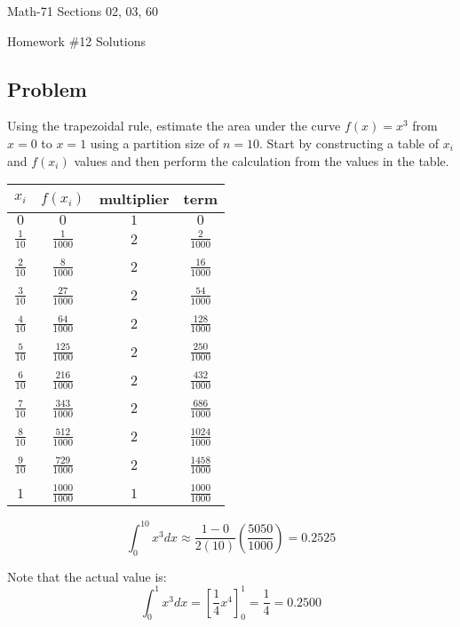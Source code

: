 \documentclass[letterpaper,12pt,fleqn]{article}
\begin{document}
\begin{center}
  \large
  Math-71 Sections 02, 03, 60

  \Large
  Homework \#12 Solutions
\end{center}

\subsection*{Problem}

Using the trapezoidal rule, estimate the area under the curve \(f(x)=x^3\) from \(x=0\) to \(x=1\) using a partition
size of \(n=10\).  Start by constructing a table of \(x_i\) and \(f(x_i)\) values and then perform the calculation
from the values in the table.

\begin{tabular}{c|c|c|c}
  \(x_i\) & \(f(x_i)\) & multiplier & term \\
  \hline
  \(0\) & \(0\) & \(1\) & \(0\) \\
  \(\frac{1}{10}\) & \(\frac{1}{1000}\) & \(2\) & \(\frac{2}{1000}\) \\
  & & & \\
  \(\frac{2}{10}\) & \(\frac{8}{1000}\) & \(2\) & \(\frac{16}{1000}\) \\
  & & & \\
  \(\frac{3}{10}\) & \(\frac{27}{1000}\) & \(2\) & \(\frac{54}{1000}\) \\
  & & & \\
  \(\frac{4}{10}\) & \(\frac{64}{1000}\) & \(2\) & \(\frac{128}{1000}\) \\
  & & & \\
  \(\frac{5}{10}\) & \(\frac{125}{1000}\) & \(2\) & \(\frac{250}{1000}\) \\
  & & & \\
  \(\frac{6}{10}\) & \(\frac{216}{1000}\) & \(2\) & \(\frac{432}{1000}\) \\
  & & & \\
  \(\frac{7}{10}\) & \(\frac{343}{1000}\) & \(2\) & \(\frac{686}{1000}\) \\
  & & & \\
  \(\frac{8}{10}\) & \(\frac{512}{1000}\) & \(2\) & \(\frac{1024}{1000}\) \\
  & & & \\
  \(\frac{9}{10}\) & \(\frac{729}{1000}\) & \(2\) & \(\frac{1458}{1000}\) \\
  & & & \\
  \(1\) & \(\frac{1000}{1000}\) & \(1\) & \(\frac{1000}{1000}\)
\end{tabular}

\[\int_0^{10}x^3dx\approx\frac{1-0}{2(10)}\left(\frac{5050}{1000}\right)=0.2525\]

Note that the actual value is:
\[\int_0^1x^3dx=\left[\frac{1}{4}x^4\right]_0^1=\frac{1}{4}=0.2500\]
\end{document}
